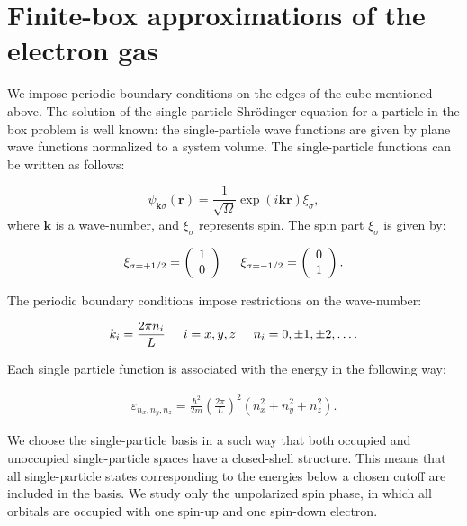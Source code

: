 \documentclass[twoside,english]{uiofysmaster}
\begin{document}
\section{Finite-box approximations of the electron gas}
We impose periodic boundary conditions on the edges of the cube mentioned above. The solution of the single-particle Shr\"{o}dinger equation for a particle in the box problem is well known: the single-particle wave functions are given by plane wave functions normalized to a system volume. The single-particle functions can be written as follows:

\begin{equation}
\psi_{\mathbf{k}\sigma}(\mathbf{r})= \frac{1}{\sqrt{\Omega}}\exp{(i\mathbf{kr})}\xi_{\sigma},
\end{equation}
where $\mathbf{k}$ is a wave-number, and $\xi_{\sigma}$ represents spin. The spin part $\xi_{\sigma}$ is given by:

\begin{equation}
\xi_{\sigma=+1/2}=\left(\begin{array}{c} 1 \\ 0 \end{array}\right) \hspace{0.5cm}
\xi_{\sigma=-1/2}=\left(\begin{array}{c} 0 \\ 1 \end{array}\right).
\end{equation}

The periodic boundary conditions impose restrictions on the wave-number:

\begin{equation}
k_i=\frac{2\pi n_i}{L}\hspace{0.5cm} i=x,y,z \hspace{0.5cm} n_i=0,\pm 1,\pm 2, \dots .
\end{equation}

Each single particle function is associated with the energy in the following way:

\begin{align}
\varepsilon_{n_{x}, n_{y}, n_{z}} = \frac{\hbar^{2}}{2m}
\left( \frac{2\pi }{L}\right)^{2}
\left( n_{x}^{2} + n_{y}^{2} + n_{z}^{2}\right).
\end{align}

We choose the single-particle basis in a such way that both occupied
and unoccupied single-particle spaces have a closed-shell
structure. This means that all single-particle states corresponding to
the energies below a chosen cutoff are included in the basis. We study
only the unpolarized spin phase, in which all orbitals are occupied
with one spin-up and one spin-down electron.
\end{document}
